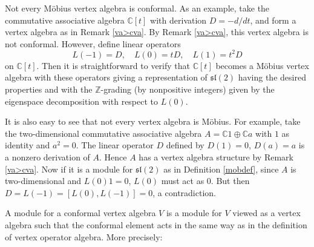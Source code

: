 \documentclass[12pt]{article}
\begin{document}
\begin{rema}{\rm
Not every M\"obius vertex algebra is conformal. As an example, take
the commutative associative algebra ${\mathbb C}[t]$ with derivation
$D=-d/dt$, and form a vertex algebra as in Remark \ref{va>cva}. By
Remark \ref{va>cva}, this vertex algebra is not conformal. However,
define linear operators
\[
L(-1)=D,\quad L(0)=tD,\quad L(1)=t^2D
\]
on ${\mathbb C}[t]$. Then it is straightforward to verify that ${\mathbb
C}[t]$ becomes a M\"obius vertex algebra with these operators giving a
representation of ${\mathfrak s}{\mathfrak l}(2)$ having the desired
properties and with the ${\mathbb Z}$-grading (by nonpositive integers)
given by the eigenspace decomposition with respect to $L(0)$.}
\end{rema}

\begin{rema}{\rm
It is also easy to see that not every vertex algebra is M\"obius. For
example, take the two-dimensional commutative associative algebra
$A={\mathbb C}1\oplus{\mathbb C}a$ with $1$ as identity and $a^2=0$. The
linear operator $D$ defined by $D(1)=0$, $D(a)=a$ is a nonzero
derivation of $A$. Hence $A$ has a vertex algebra structure by Remark
\ref{va>cva}. Now if it is a module for ${\mathfrak s}{\mathfrak l}(2)$ as in
Definition \ref{mobdef}, since $A$ is two-dimensional and $L(0)1=0$,
$L(0)$ must act as $0$. But then $D=L(-1)=[L(0),L(-1)]=0$, a
contradiction.  }
\end{rema}

A module for a conformal vertex algebra $V$ is a module for $V$ viewed
as a vertex algebra such that the conformal element acts in the same
way as in the definition of vertex operator algebra. More precisely:
\end{document}
